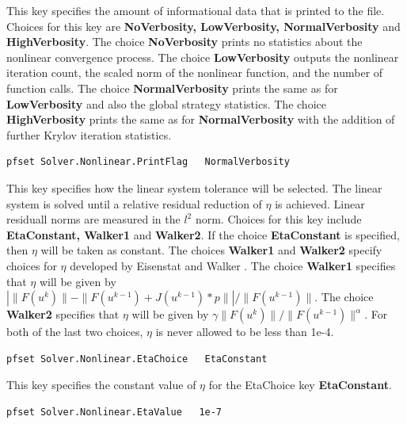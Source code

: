 {This key specifies the amount of informational data that is printed to the
 file.  Choices for this key are {\bf NoVerbosity,
LowVerbosity, NormalVerbosity} and {\bf  HighVerbosity}.  The choice
{\bf NoVerbosity} prints no statistics about the nonlinear convergence
process.  The choice {\bf LowVerbosity} outputs the nonlinear iteration count,
the scaled norm of the nonlinear function, and the number of function calls.
The choice {\bf NormalVerbosity} prints the same as for {\bf LowVerbosity}
and also the global strategy statistics.  The choice {\bf HighVerbosity} prints
the same as for {\bf NormalVerbosity} with the addition of further Krylov
iteration statistics.
}
\begin{display}\begin{verbatim}
pfset Solver.Nonlinear.PrintFlag   NormalVerbosity
\end{verbatim}\end{display}

{This key specifies how the linear system tolerance will be selected.
The linear system is solved until a relative residual reduction of $\eta$
is achieved.  Linear residuall norms are measured in the $l^2$ norm.
Choices for this key include {\bf EtaConstant, Walker1} and
{\bf Walker2}.  If the choice {\bf EtaConstant} is specified, then $\eta$ will
be taken as constant.  The choices {\bf Walker1} and {\bf Walker2} specify
choices for $\eta$ developed by Eisenstat and Walker \cite{EW96}.  The choice
{\bf Walker1} specifies that $\eta$ will be given by
$| \|F(u^k)\| - \|F(u^{k-1}) + J(u^{k-1})*p \|  |  / \|F(u^{k-1})\|$. The
choice {\bf Walker2} specifies that $\eta$ will be given by
$\gamma \|F(u^k)\| / \|F(u^{k-1})\|^{\alpha}$.  For both of the last two
choices, $\eta$ is never allowed to be less than 1e-4.
}
\begin{display}\begin{verbatim}
pfset Solver.Nonlinear.EtaChoice   EtaConstant
\end{verbatim}\end{display}


{This key specifies the constant value of $\eta$ for the EtaChoice key
{\bf EtaConstant}.
}
\begin{display}\begin{verbatim}
pfset Solver.Nonlinear.EtaValue   1e-7
\end{verbatim}\end{display}

